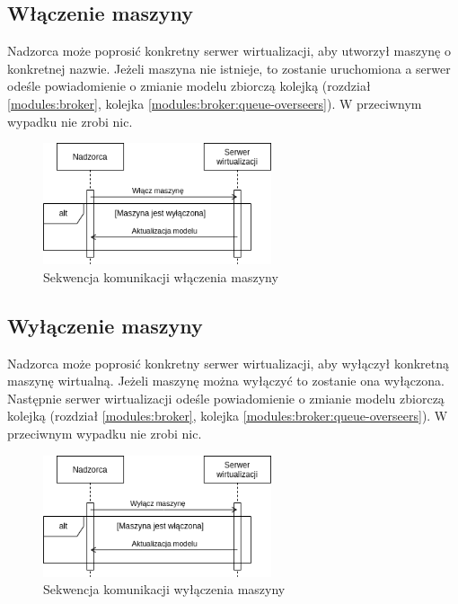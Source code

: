 \documentclass[../opis-rozwiazania.tex]{subfiles}
\begin{document}
\subsection{Włączenie maszyny}

Nadzorca może poprosić konkretny serwer wirtualizacji, aby utworzył maszynę o konkretnej nazwie.
Jeżeli maszyna nie istnieje, to zostanie uruchomiona a serwer odeśle powiadomienie o zmianie modelu zbiorczą kolejką (rozdział \ref{modules:broker}, kolejka \ref{modules:broker:queue-overseers}).
W przeciwnym wypadku nie zrobi nic.

\begin{figure}[H]
  \centering
  \includegraphics[width=0.6\textwidth]{../diagrams/sequence_diagrams/wlaczenie_maszyny.png}
  \caption{Sekwencja komunikacji włączenia maszyny}
  \label{figure:diagrams:sequence_diagrams:wlaczenie_maszyny}
\end{figure}

\subsection{Wyłączenie maszyny}

Nadzorca może poprosić konkretny serwer wirtualizacji, aby wyłączył konkretną maszynę wirtualną.
Jeżeli maszynę można wyłączyć to zostanie ona wyłączona.
Następnie serwer wirtualizacji odeśle powiadomienie o zmianie modelu zbiorczą kolejką (rozdział \ref{modules:broker}, kolejka \ref{modules:broker:queue-overseers}).
W przeciwnym wypadku nie zrobi nic.

\begin{figure}[H]
  \centering
  \includegraphics[width=0.6\textwidth]{../diagrams/sequence_diagrams/wylaczenie_maszyny.png}
  \caption{Sekwencja komunikacji wyłączenia maszyny}
  \label{figure:diagrams:sequence_diagrams:wylaczenie_maszyny}
\end{figure}
\end{document}
